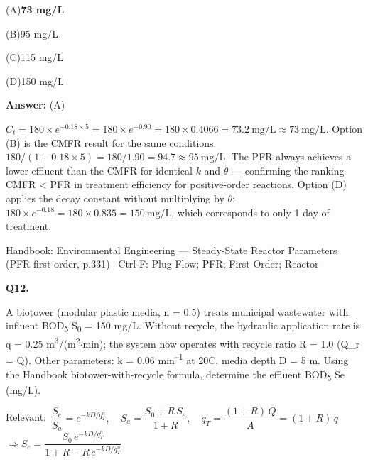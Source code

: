 \documentclass[11pt]{article}
\newcommand{\correct}[1]{\textbf{#1}\;{\color{accent}$\checkmark$}}
\newcommand{\optline}[2]{\par\noindent\hspace{1.2em}(#1)\hspace{0.6em}#2}
\begin{document}
\optline{A}{\correct{73 mg/L}}
\optline{B}{95 mg/L}
\optline{C}{115 mg/L}
\optline{D}{150 mg/L}
\par\vspace{3pt}
\vspace{2pt}\par\noindent\colorbox{boxbg}{\parbox{\dimexpr\linewidth-2\fboxsep\relax}{%
\vspace{2pt}\textbf{Answer:} (A)\par\vspace{2pt}
{\small $C_t = 180\times e^{-0.18\times5} = 180\times e^{-0.90} = 180\times0.4066 = 73.2\ \mathrm{mg/L}\approx73\ \mathrm{mg/L}$. Option (B) is the CMFR result for the same conditions: $180/(1+0.18\times5) = 180/1.90 = 94.7\approx95\ \mathrm{mg/L}$. The PFR always achieves a lower effluent than the CMFR for identical $k$ and $\theta$ --- confirming the ranking CMFR < PFR in treatment efficiency for positive-order reactions. Option (D) applies the decay constant without multiplying by $\theta$: $180\times e^{-0.18} = 180\times0.835 = 150\ \mathrm{mg/L}$, which corresponds to only 1 day of treatment.}\par\vspace{2pt}
{\footnotesize\color{soft}Handbook: Environmental Engineering --- Steady-State Reactor Parameters (PFR first-order, p.331) \textbullet\ Ctrl-F: Plug Flow; PFR; First Order; Reactor}\vspace{2pt}
}}
\vspace{9pt}
\filbreak
\textbf{\color{accent}Q12.}\par\vspace{2pt}
A biotower (modular plastic media, n = 0.5) treats municipal wastewater with influent BOD\textsubscript{5} S\textsubscript{0} = 150 mg/L. Without recycle, the hydraulic application rate is q = 0.25 m\textsuperscript{3}/(m\textsuperscript{2}$\cdot$min); the system now operates with recycle ratio R = 1.0 (Q\_r = Q). Other parameters: k = 0.06 min\textsuperscript{--}\textsuperscript{1} at 20\textdegree{}C, media depth D = 5 m. Using the Handbook biotower-with-recycle formula, determine the effluent BOD\textsubscript{5} Se (mg/L).\par\vspace{3pt}
{\small\color{soft}Relevant:}\ $\dfrac{S_e}{S_a} = e^{-kD/q_T^{n}},\quad S_a = \dfrac{S_0+R\,S_e}{1+R},\quad q_T = \dfrac{(1+R)\,Q}{A}=(1+R)\,q$ \quad $\Rightarrow S_e = \dfrac{S_0\,e^{-kD/q_T^n}}{1+R-R\,e^{-kD/q_T^n}}$\par\vspace{3pt}
\end{document}
